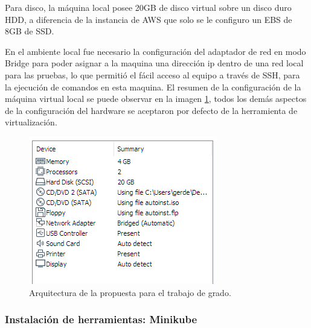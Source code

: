 \par Para disco, la m\'aquina local posee 20GB de disco virtual sobre un disco duro HDD, a diferencia de la instancia de AWS que solo se le configuro un EBS de 8GB de SSD.\\

\par En el ambiente local fue necesario la configuración del adaptador de red en modo Bridge para poder asignar a la maquina una dirección ip dentro de una red local para las pruebas, lo que permitió el fácil acceso al equipo a través de SSH, para la ejecución de comandos en esta maquina. El resumen de la configuración de la m\'aquina virtual local se puede observar en la imagen \ref{fig:vm01}, todos los demás aspectos de la configuración del hardware se aceptaron por defecto  de la herramienta de virtualizaci\'on.

\begin{figure}[htpb!]
	\centering
	\includegraphics[width=0.70\columnwidth]{images/vm01.PNG}
	\caption{Arquitectura de la propuesta para el trabajo de grado.}
	\label{fig:vm01}
\end{figure}

\subsubsection{Instalación de herramientas: Minikube}

